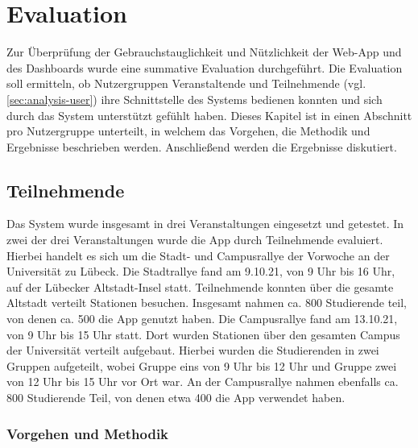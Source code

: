 \chapter{Evaluation} \label{chapter:evaluation}

Zur Überprüfung der Gebrauchstauglichkeit und Nützlichkeit der Web-App und des
Dashboards wurde eine summative Evaluation durchgeführt. Die Evaluation soll
ermitteln, ob Nutzergruppen Veranstaltende und Teilnehmende (vgl.
\autoref{sec:analysis-user}) ihre Schnittstelle des Systems bedienen konnten und
sich durch das System unterstützt gefühlt haben. Dieses Kapitel ist in einen
Abschnitt pro Nutzergruppe unterteilt, in welchem das Vorgehen, die Methodik und
Ergebnisse beschrieben werden. Anschließend werden die Ergebnisse diskutiert.

\section{Teilnehmende}

Das System wurde insgesamt in drei Veranstaltungen eingesetzt und getestet. In
zwei der drei Veranstaltungen wurde die App durch Teilnehmende evaluiert.
Hierbei handelt es sich um die Stadt- und Campusrallye der Vorwoche an der
Universität zu Lübeck. Die Stadtrallye fand am 9.10.21, von 9 Uhr bis 16 Uhr,
auf der Lübecker Altstadt-Insel statt. Teilnehmende konnten über die gesamte
Altstadt verteilt Stationen besuchen. Insgesamt nahmen ca. 800 Studierende teil,
von denen ca. 500 die App genutzt haben. Die Campusrallye fand am 13.10.21, von
9 Uhr bis 15 Uhr statt. Dort wurden Stationen über den gesamten Campus der
Universität verteilt aufgebaut. Hierbei wurden die Studierenden in zwei Gruppen
aufgeteilt, wobei Gruppe eins von 9 Uhr bis 12 Uhr und Gruppe zwei von 12 Uhr
bis 15 Uhr vor Ort war. An der Campusrallye nahmen ebenfalls ca. 800 Studierende
Teil, von denen etwa 400 die App verwendet haben.



\subsection{Vorgehen und Methodik}

